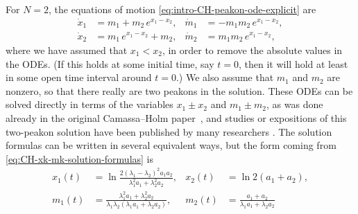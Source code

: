 \documentclass[10pt,a4paper]{article} \pdfoutput=1 
\begin{document}
\begin{example}
  \label{ex:CH-two-peakons}
  For $N=2$, the equations of motion \eqref{eq:intro-CH-peakon-ode-explicit} are
  \begin{equation}
    \label{eq:CH-twopeakon-ode}
    \begin{aligned}
      \dot x_1 &= m_1 + m_2 \, e^{x_1-x_2}
      , &
      \dot m_1 &= -m_1 m_2 \, e^{x_1-x_2}
      , \\
      \dot x_2 &= m_1 \, e^{x_1-x_2} + m_2
      , &
      \dot m_2 &= m_1 m_2 \, e^{x_1-x_2}
      ,
    \end{aligned}
  \end{equation}
  where we have assumed that $x_1 < x_2$,
  in order to remove the absolute values in the ODEs.
  (If this holds at some initial time, say $t=0$, then it will hold
  at least in some open time interval around $t=0$.)
  We also assume that $m_1$ and $m_2$ are nonzero, so that there really are
  two peakons in the solution.
  These ODEs can be solved directly in terms of the variables $x_1 \pm x_2$ and $m_1 \pm m_2$,
  as was done already in the original Camassa--Holm paper~\cite{camassa-holm:1993:CH-orginal-paper},
  and studies or expositions of this two-peakon solution have been published by many researchers
  \cite{camassa-holm-hyman:1994:CH-new-integrable,
    constantin:1997:CH-soliton-interactions:Expositiones,
    beals-sattinger-szmigielski:2000:moment,
    beals-sattinger-szmigielski:2001:peakon-antipeakon-NEEDS99,
    alber-miller:2001:CH-twopeakon,
    wahlen:2006:CH-peakon-antipeakon-interaction,
    lundmark:2007:DP-shockpeakons,
    parker:2008:CH-peakons-dynamics,
    grunert-holden:2016:CH-peakon-antipeakon-alpha-dissipative,
    lundmark-shuaib:2019:ghostpeakons,
    cieslak-gaczkowski-kubkowski-malogrosz:2017:CH-multipeakons-as-geodesics,
    cieslak-krynski:2021:CH-geometric-aspects-of-two-and-threepeakons}.
  The solution formulas can be written in several equivalent ways,
  but the form coming from \eqref{eq:CH-xk-mk-solution-formulas} is
  \begin{equation}
    \label{eq:CH-twopeakon-x-m}
    \begin{aligned}
      x_1(t) &= \ln \frac{2 (\lambda_1-\lambda_2)^2 a_1 a_2}{\lambda_1^2 a_1 + \lambda_2^2a_2}
      , &
      x_2(t) &= \ln 2 (a_1+a_2)
      , \\
      m_1(t) &= \frac{\lambda_1^2 a_1 + \lambda_2^2 a_2}{\lambda_1 \lambda_2 \left( \lambda_1 a_1 + \lambda_2 a_2\right)}
      , &
      m_2(t) &= \frac{a_1+a_2}{\lambda_1 a_1+\lambda_2 a_2}

\end{aligned}
\end{equation}
\end{example}
\end{document}
